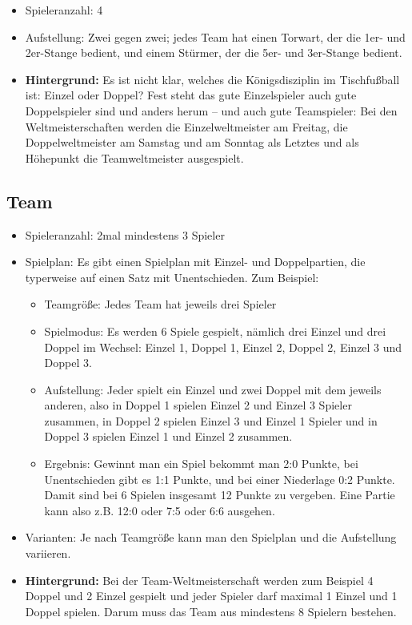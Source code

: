 \begin{itemize}
\item Spieleranzahl: 4
\item Aufstellung: Zwei gegen zwei; jedes Team hat einen Torwart, der die 1er- und 2er-Stange bedient, und einem Stürmer, der die 5er- und 3er-Stange bedient.
\item {\bf Hintergrund:} Es ist nicht klar, welches die Königsdisziplin im Tischfußball ist: Einzel oder Doppel? Fest steht das gute Einzelspieler auch gute Doppelspieler sind und anders herum -- und auch gute Teamspieler: 
Bei den Weltmeisterschaften werden die Einzelweltmeister am Freitag, die Doppelweltmeister am Samstag und am Sonntag als Letztes und als Höhepunkt die Teamweltmeister ausgespielt. 
\end{itemize}

\subsection{Team}
\label{spielformen:npersonen:team}

\begin{itemize}
\item Spieleranzahl: 2mal mindestens 3 Spieler
\item Spielplan: Es gibt einen Spielplan mit Einzel- und Doppelpartien, die typerweise auf einen Satz mit Unentschieden. Zum Beispiel:
\begin{itemize}
\item Teamgröße: Jedes Team hat jeweils drei Spieler
\item Spielmodus: Es werden 6 Spiele gespielt, nämlich drei Einzel und drei Doppel im Wechsel: Einzel 1, Doppel 1, Einzel 2, Doppel 2, Einzel 3 und Doppel 3.
\item Aufstellung: Jeder spielt ein Einzel und zwei Doppel mit dem jeweils anderen, also in Doppel 1 spielen Einzel 2 und Einzel 3 Spieler zusammen, in Doppel 2 spielen Einzel 3 und Einzel 1 Spieler und in Doppel 3 spielen Einzel 1 und Einzel 2 zusammen.  
\item Ergebnis: Gewinnt man ein Spiel bekommt man 2:0 Punkte, bei Unentschieden gibt es 1:1 Punkte, und bei einer Niederlage 0:2 Punkte. Damit sind bei 6 Spielen insgesamt 12 Punkte zu vergeben. Eine Partie kann also z.B. 12:0 oder 7:5 oder 6:6 ausgehen. 
\end{itemize}
\item Varianten: Je nach Teamgröße kann man den Spielplan und die Aufstellung variieren. 
\item {\bf Hintergrund:} Bei der Team-Weltmeisterschaft werden zum Beispiel 4 Doppel und 2 Einzel gespielt und jeder Spieler darf maximal 1 Einzel und 1 Doppel spielen. Darum muss das Team aus mindestens 8 Spielern bestehen. 
\end{itemize}
 
